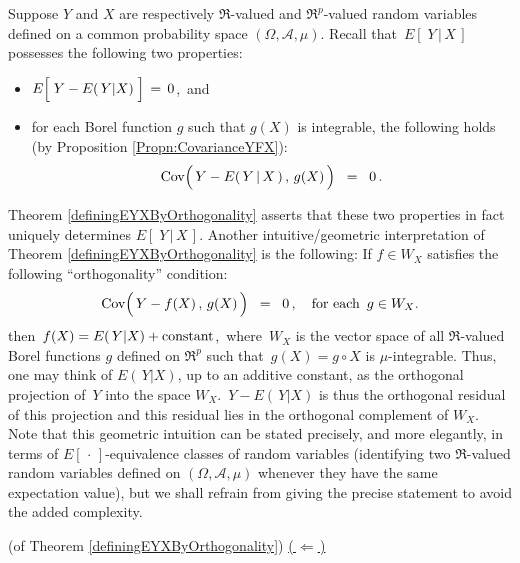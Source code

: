 \begin{remark}\quad
Suppose $Y$ and $X$ are respectively $\Re$-valued and $\Re^{p}$-valued random variables
defined on a common probability space $(\Omega,\mathcal{A},\mu)$.
Recall that \,$E\!\left[\;Y\,\vert\,X\,\right]$\, possesses the following two properties:
\begin{itemize}
\item
	$E\!\left[\;Y \overset{{\color{white}.}}{-} E\!\left(\,Y\vert X\right)\;\right] \,=\, 0$,\, and
\item
	for each Borel function $g$ such that $g(X)$ is integrable,
	the following holds (by Proposition \ref{Propn:CovarianceYFX}):
	\begin{equation*}
	\Cov\!\left(\,\overset{{\color{white}.}}{Y} - E(\,Y\,\vert\,X\,)\,,\,g(X)\,\right)
	\;\; = \;\; 0 \,.
	\end{equation*}
\end{itemize}
Theorem \ref{definingEYXByOrthogonality} asserts that these two properties
in fact uniquely determines $E\!\left[\;Y\,\vert\,X\,\right]$.
Another intuitive/geometric interpretation of Theorem \ref{definingEYXByOrthogonality}
is the following:
\vskip 0.3cm
\noindent
If $f \in W_{X}$ satisfies the following ``orthogonality'' condition:
\begin{equation*}
\Cov\!\left(\,\overset{{\color{white}.}}{Y} - f(X)\,,\,g(X)\,\right)
\;\; = \;\; 0 \,,
\quad
\textnormal{for each \,$g \in W_{X}$.}
\end{equation*}
then \,$f(X) = E\!\left(\,Y\vert X\right) + \textnormal{constant}$,\,
where \,$W_{X}$ is the vector space of all $\Re$-valued Borel functions $g$ defined on
$\Re^{p}$ such that \,$g(X) = g \circ X$ is $\mu$-integrable.
Thus, one may think of $E\!\left(\,Y\vert X\right)$, up to an additive constant, as the
orthogonal projection of \,$Y$ into the space $W_{X}$.
\,$Y - E\!\left(\,Y\vert X\right)$ is thus the orthogonal residual of this projection and
this residual lies in the orthogonal complement of $W_{X}$.
\vskip 0.3cm
\noindent
Note that this geometric intuition can be stated precisely, and more elegantly, in
terms of $E\!\left[\,\cdot\,\right]$-equivalence classes of random variables
(identifying two $\Re$-valued random variables defined on $(\Omega,\mathcal{A},\mu)$
whenever they have the same expectation value), but we shall
refrain from giving the precise statement to avoid the added complexity.
\end{remark}
\proofof(of Theorem \ref{definingEYXByOrthogonality})
\vskip 0.1cm
\noindent
\underline{(\,$\Longleftarrow$\,)}\quad
